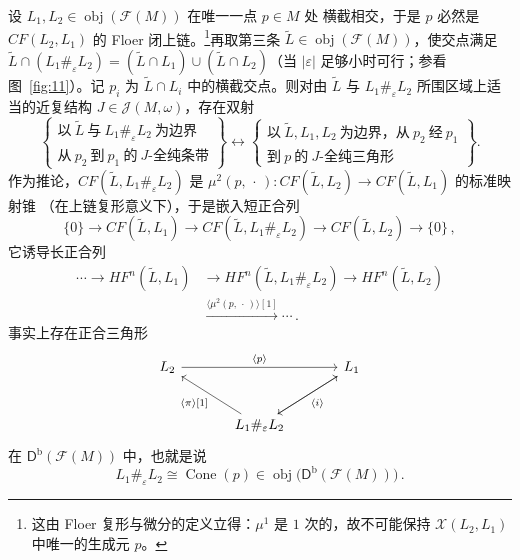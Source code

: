 \begin{Thm}\label{thm:6.28}
设 $L_1,L_2\in\operatorname{obj}(\mathcal F(M))$ 在唯一一点 $p\in M$ 处
横截相交，于是 $p$ 必然是 $CF(L_2,L_1)$ 的 Floer 闭上链。\footnote{这由
Floer 复形与微分的定义立得：$\mu^1$ 是 $1$ 次的，故不可能保持
$\mathcal X(L_2,L_1)$ 中唯一的生成元 $p$。}再取第三条
$\tilde L\in\operatorname{obj}(\mathcal F(M))$，使交点满足
$\tilde L\cap(L_1\#_\varepsilon L_2)=(\tilde L\cap L_1)\cup
(\tilde L\cap L_2)$（当 $|\varepsilon|$ 足够小时可行；参看图~\ref{fig:11}）。记
$p_i$ 为 $\tilde L\cap L_i$ 中的横截交点。则对由 $\tilde L$ 与
$L_1\#_\varepsilon L_2$ 所围区域上适当的近复结构
$J\in\mathcal J(M,\omega)$，存在双射
\[
\left\{\begin{array}{c}
\text{以}\ \tilde L\ \text{与}\ L_1\#_\varepsilon L_2\ \text{为边界}\\
\text{从}\ p_2\ \text{到}\ p_1\ \text{的}\ J\text{-全纯条带}
\end{array}\right\}
\longleftrightarrow
\left\{\begin{array}{c}
\text{以}\ \tilde L,L_1,L_2\ \text{为边界，从}\ p_2\ \text{经}\ p_1\\
\text{到}\ p\ \text{的}\ J\text{-全纯三角形}
\end{array}\right\}.
\]
作为推论，$CF(\tilde L,L_1\#_\varepsilon L_2)$ 是
$\mu^2(p,\,\cdot\,):CF(\tilde L,L_2)\to CF(\tilde L,L_1)$ 的标准映射锥
（在上链复形意义下），于是嵌入短正合列
\[
\{0\}\to CF(\tilde L,L_1)\to CF(\tilde L,L_1\#_\varepsilon L_2)
\to CF(\tilde L,L_2)\to\{0\}\,,
\]
它诱导长正合列
\begin{equation}
\begin{aligned}
\cdots\to HF^n(\tilde L,L_1)&\to HF^n(\tilde L,L_1\#_\varepsilon L_2)
\to HF^n(\tilde L,L_2)\\
&\xrightarrow{\langle\mu^2(p,\,\cdot\,)\rangle[1]}\cdots\,.
\end{aligned}
\label{eq:6.96}
\end{equation}
事实上存在正合三角形
\begin{equation}
\begin{tikzcd}[row sep=2.6em, column sep=3.4em]
L_2 \arrow[rr, "\langle p\rangle"] & & L_1 \arrow[dl] \\
& L_1\#_\varepsilon L_2 \arrow[ul, "\langle\pi\rangle{[}1{]}"] \arrow[ur, "\langle i\rangle" swap] &
\end{tikzcd}
\label{eq:6.97}
\end{equation}
在 $\mathsf D^{\mathrm b}(\mathcal F(M))$ 中，也就是说
\begin{equation}
L_1\#_\varepsilon L_2\cong\operatorname{Cone}(p)
\in\operatorname{obj}\bigl(\mathsf D^{\mathrm b}(\mathcal F(M))\bigr)\,.
\label{eq:6.98}
\end{equation}
\end{Thm}

